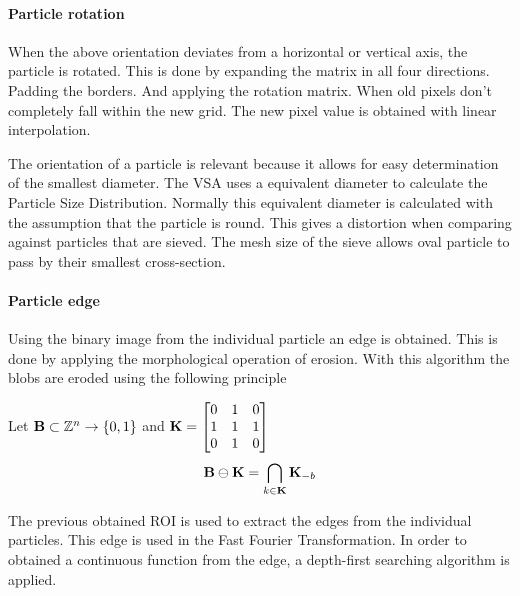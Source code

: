 \documentclass[11pt,fleqn,,a4paper,twoside,openright]{book}
\begin{document}
\paragraph{Particle rotation}\label{Particle rotation}
When the above orientation deviates from a horizontal or vertical axis, the particle is rotated. This is done by expanding the matrix in all four directions. Padding the borders. And applying the rotation matrix. When old pixels don't completely fall within the new grid. The new pixel value is obtained with linear interpolation.

\begin{remark}
	The orientation of a particle is relevant because it allows for easy determination of the smallest diameter. The VSA uses a equivalent diameter to calculate the Particle Size Distribution. Normally this equivalent diameter is calculated with the assumption that the particle is round. This gives a distortion when comparing against particles that are sieved. The mesh size of the sieve allows oval particle to pass by their smallest cross-section.
\end{remark}

\paragraph{Particle edge}
Using the binary image from the individual particle an edge is obtained. This is done by applying the morphological operation of erosion. With this algorithm the blobs are eroded using the following principle
\begin{sBox}
	Let $\mat{B} \subset \mathbb{Z}^n \rightarrow \{0, 1\}$ and $ \mat{K} = \begin{bmatrix}
	0 & 1 & 0 \\
	1 & 1 & 1 \\
	0 & 1 & 0 \\
	\end{bmatrix} $
	\begin{equation}
	\mat{B}  \ominus \mat{K} = \bigcap_{k\in \mat{K}} \mat{K}_{-b}
	\end{equation}
\end{sBox}

The previous obtained ROI is used to extract the edges from the individual particles. This edge is used in the Fast Fourier Transformation. In order to obtained a continuous function from the edge, a depth-first searching algorithm is applied. 
\end{document}
